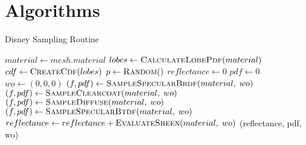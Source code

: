 \chapter*{Algorithms}

\begin{algorithm}
    \caption{Disney Sampling Routine}
    \label{alg:disney-sampling}
    \begin{algorithmic}[1] %
            \State $material \gets mesh.material$ 
            \State $lobes \gets \Call{CalculateLobePdf}{material}$
            \State $cdf \gets \Call{CreateCdf}{lobes}$
            \State $p \gets \Call{Random}$
            \State
            \State $reflectance \gets 0$
            \State $pdf \gets 0$
            \State $wo \gets (0,0,0)$
            \State
                \State $(f, pdf) \gets \Call{SampleSpecularBrdf}{material,\;wo}$
                \State $(f, pdf) \gets \Call{SampleClearcoat}{material,\;wo}$
                \State $(f, pdf) \gets \Call{SampleDiffuse}{material,\;wo}$
                \State $(f, pdf) \gets \Call{SampleSpecularBtdf}{material,\;wo}$
            \EndIf
            \State
            \State $reflectance \gets reflectance + \Call{EvaluateSheen}{material,\;wo}$
            \State
            \Return (reflectance, pdf, wo)
        \EndProcedure
    \end{algorithmic}
\end{algorithm}

